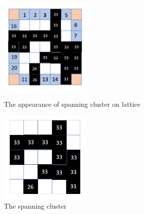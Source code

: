 \documentclass[12pt]{article}
\begin{document}
\begin{figure}[h]
\centering
\includegraphics[width=0.4\textwidth]{Spanning1}
\caption{The appearance of spanning cluster on lattice}
\label{Spanning1}
\includegraphics[width=0.4\textwidth]{Spanning2}
\caption{The spanning cluster}
\label{Spanning2}
\end{figure}
\end{document}
